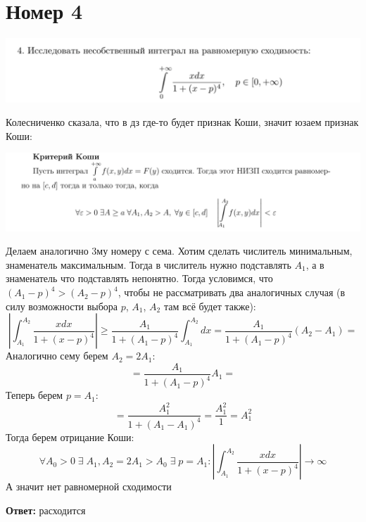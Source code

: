 \documentclass[a4paper,12pt]{article}
\begin{document}
\section*{Номер 4}
\begin{center}
\includegraphics[scale=0.5]{4.png}
\end{center}
Колесниченко сказала, что в дз где-то будет признак Коши, значит юзаем признак Коши:
\begin{center}
\includegraphics[scale=0.3]{koshi.png}
\end{center}
Делаем аналогично 3му номеру с сема. Хотим сделать числитель минимальным, знаменатель максимальным. Тогда в числитель нужно подставлять $A_1$, а в знаменатель что подставлять непонятно. Тогда условимся, что $(A_1 - p)^4 > 	(A_2 - p)^4$, чтобы не рассматривать два аналогичных случая (в силу возможности выбора $p$, $A_1$, $A_2$ там всё будет также):
\[
\left|
\int_{A_1}^{A_2} \frac{xdx}{1 + (x - p)^4}
\right|
\geq 
\frac{A_1}{1 + (A_1 - p)^4}
\int_{A_1}^{A_2}  dx  
=
\frac{A_1}{1 + (A_1 - p)^4}
(A_2 - A_1)
=
\]
Аналогично сему берем $A_2 = 2A_1$:
\[ 
=
\frac{A_1}{1 + (A_1 - p)^4}
A_1
=
\]
Теперь берем $p = A_1$:
\[
=
\frac{A_1^2}{1 + (A_1 - A_1)^4}
=
\frac{A_1^2}{1}
=
A_1^2
\]
Тогда берем отрицание Коши:
\[
\forall A_0 > 0 \; \exists \; A_1, A_2 = 2A_1 > A_0 \; \exists \; p = A_1 : 
\left|
\int_{A_1}^{A_2} \frac{xdx}{1 + (x - p)^4}
\right| \longrightarrow \infty
\]
А значит нет равномерной сходимости
\begin{center}
\textbf{Ответ:} расходится
\end{center}
\end{document}
